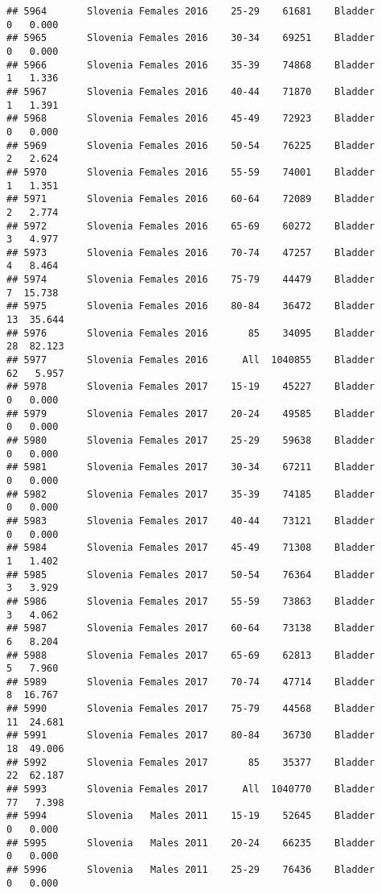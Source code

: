 \documentclass[
]{article}
\begin{document}
\begin{verbatim}
## 5964       Slovenia Females 2016    25-29    61681    Bladder      0   0.000
## 5965       Slovenia Females 2016    30-34    69251    Bladder      0   0.000
## 5966       Slovenia Females 2016    35-39    74868    Bladder      1   1.336
## 5967       Slovenia Females 2016    40-44    71870    Bladder      1   1.391
## 5968       Slovenia Females 2016    45-49    72923    Bladder      0   0.000
## 5969       Slovenia Females 2016    50-54    76225    Bladder      2   2.624
## 5970       Slovenia Females 2016    55-59    74001    Bladder      1   1.351
## 5971       Slovenia Females 2016    60-64    72089    Bladder      2   2.774
## 5972       Slovenia Females 2016    65-69    60272    Bladder      3   4.977
## 5973       Slovenia Females 2016    70-74    47257    Bladder      4   8.464
## 5974       Slovenia Females 2016    75-79    44479    Bladder      7  15.738
## 5975       Slovenia Females 2016    80-84    36472    Bladder     13  35.644
## 5976       Slovenia Females 2016       85    34095    Bladder     28  82.123
## 5977       Slovenia Females 2016      All  1040855    Bladder     62   5.957
## 5978       Slovenia Females 2017    15-19    45227    Bladder      0   0.000
## 5979       Slovenia Females 2017    20-24    49585    Bladder      0   0.000
## 5980       Slovenia Females 2017    25-29    59638    Bladder      0   0.000
## 5981       Slovenia Females 2017    30-34    67211    Bladder      0   0.000
## 5982       Slovenia Females 2017    35-39    74185    Bladder      0   0.000
## 5983       Slovenia Females 2017    40-44    73121    Bladder      0   0.000
## 5984       Slovenia Females 2017    45-49    71308    Bladder      1   1.402
## 5985       Slovenia Females 2017    50-54    76364    Bladder      3   3.929
## 5986       Slovenia Females 2017    55-59    73863    Bladder      3   4.062
## 5987       Slovenia Females 2017    60-64    73138    Bladder      6   8.204
## 5988       Slovenia Females 2017    65-69    62813    Bladder      5   7.960
## 5989       Slovenia Females 2017    70-74    47714    Bladder      8  16.767
## 5990       Slovenia Females 2017    75-79    44568    Bladder     11  24.681
## 5991       Slovenia Females 2017    80-84    36730    Bladder     18  49.006
## 5992       Slovenia Females 2017       85    35377    Bladder     22  62.187
## 5993       Slovenia Females 2017      All  1040770    Bladder     77   7.398
## 5994       Slovenia   Males 2011    15-19    52645    Bladder      0   0.000
## 5995       Slovenia   Males 2011    20-24    66235    Bladder      0   0.000
## 5996       Slovenia   Males 2011    25-29    76436    Bladder      0   0.000

\end{verbatim}
\end{document}
